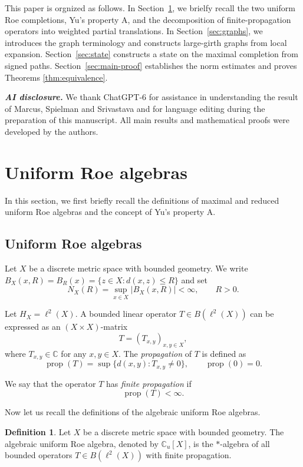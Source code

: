 \documentclass[11pt,a4paper]{article}
\theoremstyle{definition}\newtheorem{definition}[theorem]{Definition}
\theoremstyle{remark}\newtheorem{remark}[theorem]{Remark}
\DeclareMathOperator{\prop}{prop}
\begin{document}
This paper is orgnized as follows. In Section~\ref{sec:roe}, we brielfy recall the two uniform Roe completions, Yu's
property A, and the decomposition of finite-propagation operators
into weighted partial translations. In Section~\ref{sec:graphs}, we
introduces the graph terminology and constructs large-girth graphs
from local expansion. Section~\ref{sec:state} constructs a state on
the maximal completion from signed paths. Section~\ref{sec:main-proof}
establishes the norm estimates and proves
Theorems \ref{thm:equivalence}.


\emph{\bf AI disclosure.}  We thank ChatGPT-6 for assistance in understanding the result of
Marcus, Spielman and Srivastava \cite{MSS} and for language editing
during the preparation of this manuscript.
All main results and mathematical proofs were developed by the authors.




\section{Uniform Roe algebras}\label{sec:roe}
In this section, we first briefly recall the definitions of maximal and reduced uniform Roe algebras and the concept of Yu's property A. 


\subsection{Uniform Roe algebras}
Let $X$ be a discrete metric space with bounded geometry. We write
$B_X(x,R)=B_R(x)=\{z\in X:d(x,z)\le R\}$ and set
$$
N_X(R)=\sup_{x\in X}|B_X(x,R)|<\infty, \qquad R>0.
$$

Let $H_X=\ell^2(X)$. A bounded linear operator $T\in B(\ell^2(X))$ can be expressed as an $(X\times X)$-matrix
$$T=(T_{x,y})_{x,y\in X},$$
where $T_{x,y}\in \mathbb{C}$ for any $x,y\in X$. The \emph{propagation} of $T$ is defined as 
$$
\prop(T)=\sup\{d(x,y):T_{x,y}\neq 0\},\qquad \prop(0)=0.
$$

We say that the operator $T$ has \emph{finite propagation} if 
$$\prop(T)<\infty.$$



Now let us recall the definitions of the algebraic uniform Roe algebras.
\begin{definition}
Let $X$ be a discrete metric space with bounded geometry. The algebraic uniform Roe algebra, denoted by $\mathbb{C}_u[X]$, is the $*$-algebra of all bounded operators $T\in B(\ell^2(X))$ with finite propagation.    
\end{definition}
\end{document}
